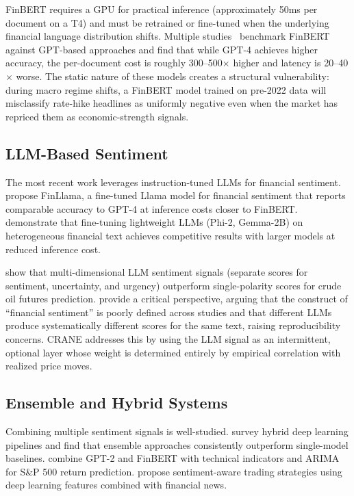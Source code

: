 FinBERT requires a GPU for practical inference (approximately 50ms per document on a T4) and must be retrained or fine-tuned when the underlying financial language distribution shifts. Multiple studies~\cite{iacovides2024finllama, cristescu2025finbert} benchmark FinBERT against GPT-based approaches and find that while GPT-4 achieves higher accuracy, the per-document cost is roughly 300--500$\times$ higher and latency is 20--40$\times$ worse. The static nature of these models creates a structural vulnerability: during macro regime shifts, a FinBERT model trained on pre-2022 data will misclassify rate-hike headlines as uniformly negative even when the market has repriced them as economic-strength signals.

\subsection{LLM-Based Sentiment}

The most recent work leverages instruction-tuned LLMs for financial sentiment. \citet{iacovides2024finllama} propose FinLlama, a fine-tuned Llama model for financial sentiment that reports comparable accuracy to GPT-4 at inference costs closer to FinBERT. \citet{amorin2025lightweight} demonstrate that fine-tuning lightweight LLMs (Phi-2, Gemma-2B) on heterogeneous financial text achieves competitive results with larger models at reduced inference cost.

\citet{dai2026beyond} show that multi-dimensional LLM sentiment signals (separate scores for sentiment, uncertainty, and urgency) outperform single-polarity scores for crude oil futures prediction. \citet{kirtac2025llmfinance} provide a critical perspective, arguing that the construct of ``financial sentiment'' is poorly defined across studies and that different LLMs produce systematically different scores for the same text, raising reproducibility concerns. CRANE addresses this by using the LLM signal as an intermittent, optional layer whose weight is determined entirely by empirical correlation with realized price moves.

\subsection{Ensemble and Hybrid Systems}

Combining multiple sentiment signals is well-studied. \citet{mishra2025hybrid} survey hybrid deep learning pipelines and find that ensemble approaches consistently outperform single-model baselines. \citet{liu2025enhancing} combine GPT-2 and FinBERT with technical indicators and ARIMA for S\&P 500 return prediction. \citet{passalis2021sentiment} propose sentiment-aware trading strategies using deep learning features combined with financial news.

